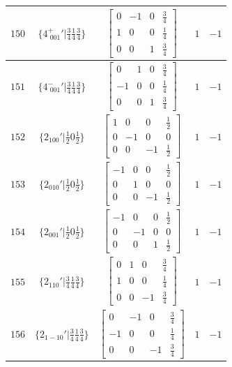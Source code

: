 \documentclass[fleqn,8pt]{jsarticle}
\begin{document}
\begin{longtable}{ccccc}
$ 150 $ & $ \{4^{+}_{\,\,001}{}'|\frac{3}{4} \frac{1}{4} \frac{3}{4}\} $ & $ \begin{bmatrix} 0 & -1 & 0 & \frac{3}{4} \\ 1 & 0 & 0 & \frac{1}{4} \\ 0 & 0 & 1 & \frac{3}{4} \end{bmatrix} $ & $ 1 $ & $ -1 $ \\ \hline
$ 151 $ & $ \{4^{-}_{\,\,001}{}'|\frac{3}{4} \frac{1}{4} \frac{3}{4}\} $ & $ \begin{bmatrix} 0 & 1 & 0 & \frac{3}{4} \\ -1 & 0 & 0 & \frac{1}{4} \\ 0 & 0 & 1 & \frac{3}{4} \end{bmatrix} $ & $ 1 $ & $ -1 $ \\ \hline
$ 152 $ & $ \{2{}_{100}{}'|\frac{1}{2} 0 \frac{1}{2}\} $ & $ \begin{bmatrix} 1 & 0 & 0 & \frac{1}{2} \\ 0 & -1 & 0 & 0 \\ 0 & 0 & -1 & \frac{1}{2} \end{bmatrix} $ & $ 1 $ & $ -1 $ \\ \hline
$ 153 $ & $ \{2{}_{010}{}'|\frac{1}{2} 0 \frac{1}{2}\} $ & $ \begin{bmatrix} -1 & 0 & 0 & \frac{1}{2} \\ 0 & 1 & 0 & 0 \\ 0 & 0 & -1 & \frac{1}{2} \end{bmatrix} $ & $ 1 $ & $ -1 $ \\ \hline
$ 154 $ & $ \{2{}_{001}{}'|\frac{1}{2} 0 \frac{1}{2}\} $ & $ \begin{bmatrix} -1 & 0 & 0 & \frac{1}{2} \\ 0 & -1 & 0 & 0 \\ 0 & 0 & 1 & \frac{1}{2} \end{bmatrix} $ & $ 1 $ & $ -1 $ \\ \hline
$ 155 $ & $ \{2{}_{110}{}'|\frac{3}{4} \frac{1}{4} \frac{3}{4}\} $ & $ \begin{bmatrix} 0 & 1 & 0 & \frac{3}{4} \\ 1 & 0 & 0 & \frac{1}{4} \\ 0 & 0 & -1 & \frac{3}{4} \end{bmatrix} $ & $ 1 $ & $ -1 $ \\ \hline
$ 156 $ & $ \{2{}_{1-10}{}'|\frac{3}{4} \frac{1}{4} \frac{3}{4}\} $ & $ \begin{bmatrix} 0 & -1 & 0 & \frac{3}{4} \\ -1 & 0 & 0 & \frac{1}{4} \\ 0 & 0 & -1 & \frac{3}{4} \end{bmatrix} $ & $ 1 $ & $ -1 $ \\ \hline

\end{longtable}
\end{document}
